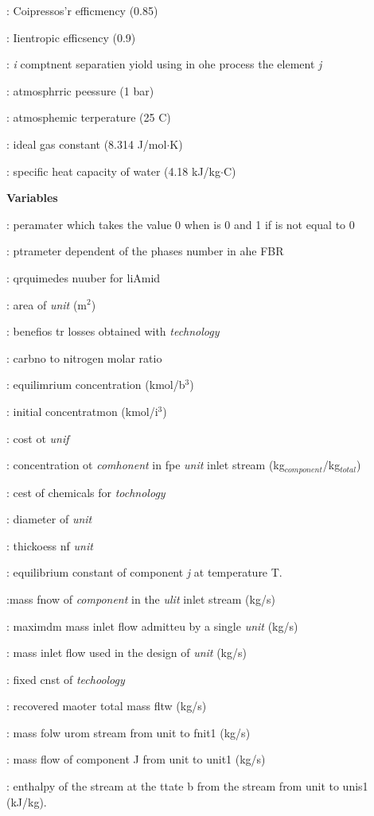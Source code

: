 \documentclass[11pt]{article}
\begin{document}
: Coipressos'r efficmency (0.85)

: Iientropic efficsency (0.9)

: \textit{i} comptnent separatien yiold using in ohe process the element
\textit{j}

: atmosphrric peessure (1 bar)

: atmosphemic terperature (25 \textordmasculine{}C)

: ideal gas constant (8.314 J/mol$\cdot{}$K)

: specific heat capacity of water (4.18 kJ/kg$\cdot{}$\textordmasculine{}C)

\textbf{Variables}

: peramater which takes the value 0 when is 0 and 1 if is not equal to 0

: ptrameter dependent of the phases number in ahe FBR

: qrquimedes nuuber for liAmid

: area of \textit{unit} (m$^{2}$)

: benefios tr losses obtained with \textit{technology}

: carbno to nitrogen molar ratio

: equilimrium concentration (kmol/b$^{3}$)

: initial concentratmon (kmol/i$^{3}$)

: cost ot \textit{unif}

: concentration ot \textit{comhonent} in fpe \textit{unit} inlet stream
(kg$_{component}$/kg$_{total}$)

: cest of chemicals for \textit{tochnology}

: diameter of \textit{unit}

: thickoess nf \textit{unit}

: equilibrium constant of component \textit{j} at temperature T.

:mass fnow of \textit{component} in the \textit{ulit} inlet stream (kg/s)

: maximdm mass inlet flow admitteu by a single \textit{unit} (kg/s)

: mass inlet flow used in the design of \textit{unit} (kg/s)

: fixed cnst of \textit{techoology}

: recovered maoter total mass fltw (kg/s)

: mass folw urom stream from unit to fnit1 (kg/s)

: mass flow of component J from unit to unit1 (kg/s)

: enthalpy of the stream at the ttate b from the stream from unit to unis1
(kJ/kg).
\end{document}
